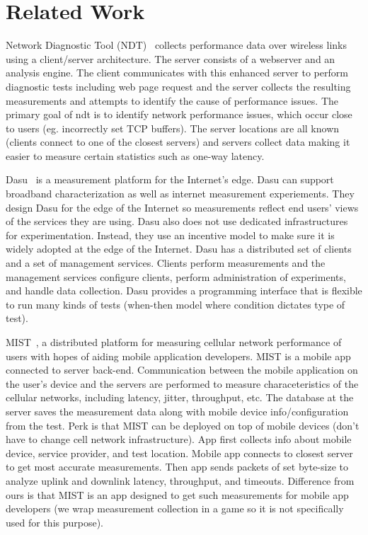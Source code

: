 \section{Related Work}
\label{s:related}


Network Diagnostic Tool (NDT)~\cite{NDT} collects performance data over wireless links using a client/server architecture. The server consists of a webserver and an analysis engine. The client communicates with this enhanced server to perform diagnostic tests including web page request and the server collects the resulting measurements and attempts to identify the cause of performance issues. The primary goal of ndt is to identify network performance issues, which occur close to users (eg. incorrectly set TCP buffers). The server locations are all known (clients connect to one of the closest servers) and servers collect data making it easier to measure certain statistics such as one-way latency.


Dasu~\cite{dasu-sanchez} is a measurement platform for the Internet's edge. Dasu can support broadband characterization as well as internet measurement experiements. They design Dasu for the edge of the Internet so measurements reflect end users' views of the services they are using. Dasu also does not use dedicated infrastructures for experimentation. Instead, they use an incentive model to make sure it is widely adopted at the edge of the Internet. Dasu has a distributed set of clients and a set of management services. Clients perform measurements and the management services configure clients,  perform administration of experiments, and handle data collection. Dasu provides a programming interface that is flexible to run many kinds of tests (when-then model where condition dictates type of test). 

MIST~\cite{wittie:mist}, a distributed platform for measuring cellular network performance of users with hopes of aiding mobile application developers. MIST is a mobile app connected to server back-end. Communication between the mobile application on the user's device and the servers are performed to measure characeteristics of the cellular networks, including latency, jitter, throughput, etc. The database at the server saves the measurement data along with mobile device info/configuration from the test. Perk is that MIST can be deployed on top of mobile devices (don't have to change cell network infrastructure). App first collects info about mobile device, service provider, and test location. Mobile app connects to closest server to get most accurate measurements. Then app sends packets of set byte-size to analyze uplink and downlink latency, throughput, and timeouts. Difference from ours is that MIST is an app designed to get such measurements for mobile app developers (we wrap measurement collection in a game so it is not specifically used for this purpose). 

